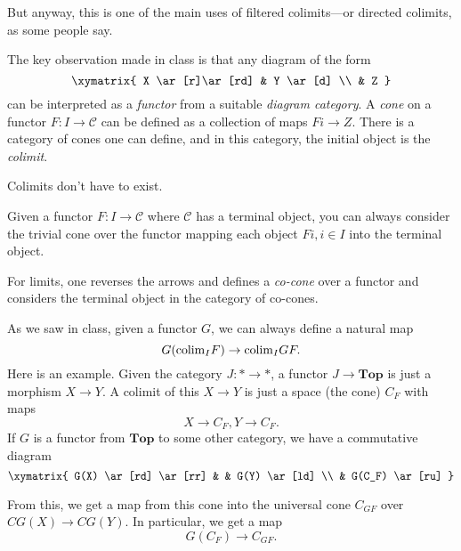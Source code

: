 But anyway, this is one of the main uses of filtered colimits---or directed
colimits, as some people say.  


The key observation made in class is that any diagram of the form
\[ 
\xymatrix{
X \ar[r]\ar[rd] &  Y \ar[d]  \\ 
& Z
}
\]
can be interpreted as a \emph{functor} from a suitable \emph{diagram category}. 
A \emph{cone} on a functor $F: I \to \mathcal{C}$ can be defined as a
collection of maps $Fi \to Z$.  There is a category of cones one can define,
and in this category, the initial object is the \emph{colimit}.  

Colimits don't have to exist.  

\begin{remark} 
Given a functor $F: I \to \mathcal{C}$ where $\mathcal{C}$ has a terminal
object, you can always consider the trivial cone over the functor mapping each
object  $Fi, i \in I$ into the terminal object. 
\end{remark} 

For limits, one reverses the arrows and defines a \emph{co-cone} over a functor
and considers the terminal object in the category of co-cones.


As we saw in class, given a functor $G$, we can always define a natural map
\[ G(\mathrm{colim}_I F) \to \mathrm{colim}_I GF.  \]
Here is an example. Given the category $J: \ast \to \ast$, a functor $J \to
\mathbf{Top}$ is just a morphism $X \to Y$. A colimit of this $X \to Y$ is just
a space (the cone) $C_F$ with maps 
\[ X \to C_F, Y \to C_F.  \]
If $G$ is a functor from $\mathbf{Top}$ to some other category, we have a
commutative diagram
\[ \xymatrix{
G(X) \ar[rd] \ar[rr] &  &  G(Y) \ar[ld] \\
& G(C_F)  \ar[ru]
}\]
	
From this, we get a map from this cone into the universal cone $C_{GF}$ over
$CG(X) \to CG(Y)$. In particular, we get a map
\[ G(C_F) \to C_{GF}.  \]

